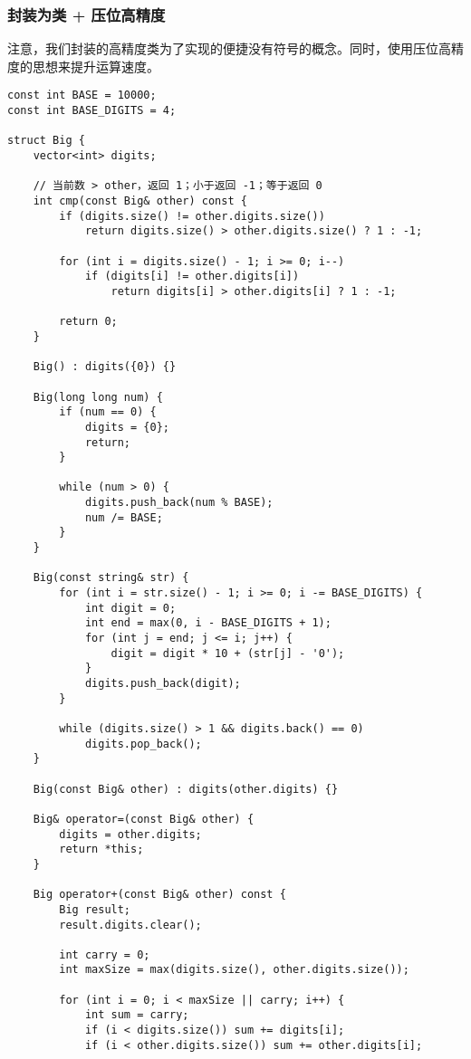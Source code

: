 \documentclass[UTF8]{article}
\begin{document}
\subsubsection{封装为类 + 压位高精度}
注意，我们封装的高精度类为了实现的便捷没有符号的概念。同时，使用压位高精度的思想来提升运算速度。
\begin{lstlisting}[caption=压位高精度类]
const int BASE = 10000; 
const int BASE_DIGITS = 4; 

struct Big {
    vector<int> digits;

    // 当前数 > other，返回 1；小于返回 -1；等于返回 0
    int cmp(const Big& other) const {
        if (digits.size() != other.digits.size())
            return digits.size() > other.digits.size() ? 1 : -1;
        
        for (int i = digits.size() - 1; i >= 0; i--) 
            if (digits[i] != other.digits[i]) 
                return digits[i] > other.digits[i] ? 1 : -1;
        
        return 0;
    }

    Big() : digits({0}) {}

    Big(long long num) {
        if (num == 0) {
            digits = {0};
            return;
        }
        
        while (num > 0) {
            digits.push_back(num % BASE);
            num /= BASE;
        }
    }

    Big(const string& str) {
        for (int i = str.size() - 1; i >= 0; i -= BASE_DIGITS) {
            int digit = 0;
            int end = max(0, i - BASE_DIGITS + 1);
            for (int j = end; j <= i; j++) {
                digit = digit * 10 + (str[j] - '0');
            }
            digits.push_back(digit);
        }
        
        while (digits.size() > 1 && digits.back() == 0)
            digits.pop_back();
    }

    Big(const Big& other) : digits(other.digits) {}

    Big& operator=(const Big& other) {
        digits = other.digits;
        return *this;
    }

    Big operator+(const Big& other) const {
        Big result;
        result.digits.clear();

        int carry = 0;
        int maxSize = max(digits.size(), other.digits.size());
        
        for (int i = 0; i < maxSize || carry; i++) {
            int sum = carry;
            if (i < digits.size()) sum += digits[i];
            if (i < other.digits.size()) sum += other.digits[i];
            

\end{lstlisting}
\end{document}
